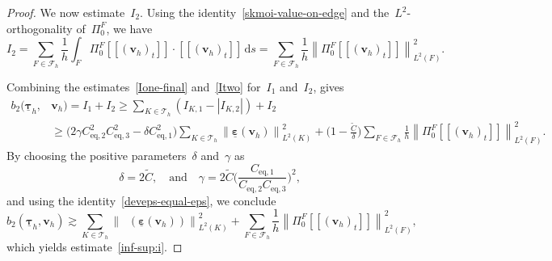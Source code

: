 \documentclass[a4paper,twoside,10pt]{article}
\theoremstyle{plain}
\theoremstyle{remark}
\theoremstyle{definition}
\numberwithin{equation}{section}
\numberwithin{figure}{section}
\newcommand{\Norm}[1]{{\left\|{#1} \right\|}}
\newcommand{\jump}[1]{\left[\!\left[#1\right]\!\right]}
\newcommand{\Tauh}{\mathcal{T}_h}
\newcommand{\K}{K}
\newcommand{\F}{F}
\newcommand{\taubfh}{\underline{\boldsymbol{\tau}}_h}
\newcommand{\vbfh}{\mathbf{v}_h}
\DeclareMathOperator{\dev}{\underline{\mathbf{dev}}}
\newcommand{\tangscalar}{t}
\newcommand{\Ltwo}{L^2}
\newcommand{\Fcalh}{\mathcal{F}_h}
\newcommand{\ds}{\, \mathrm{d}s}
\newcommand{\btwo}{b_2}
\newcommand{\epsbfun}{\underline{\boldsymbol{\varepsilon}}}
\newcommand{\PizF}{\Pi_0^{\F}}
\newcommand{\Ione}{I_1}
\newcommand{\Itwo}{I_2}
\newcommand{\Ctilde}{\widetilde{C}}
\newcommand{\Ceqone}{C_{\text{eq},1}}
\newcommand{\Ceqtwo}{C_{\text{eq},2}}
\newcommand{\Ceqthree}{C_{\text{eq},3}}
\newcommand{\IKone}{I_{\K,1}}
\newcommand{\IKtwo}{I_{\K,2}}
\begin{document}
\begin{proof}
We now estimate~$\Itwo$.
Using the identity~\eqref{skmoi-value-on-edge}
and the~$\Ltwo$-orthogonality of~$\PizF$,
we have
\begin{equation} \label{Itwo}
\Itwo 
= \sum_{\F \in \Fcalh} \frac{1}{h}\int_\F \PizF\jump{(\vbfh)_{\tangscalar}} 
  \cdot \jump{(\vbfh)_{\tangscalar}} \ds
= \sum_{\F \in \Fcalh} \frac{1}{h}
  \Norm{\PizF\jump{(\vbfh)_{\tangscalar}}}_{\Ltwo(\F)}^2.
\end{equation}

Combining the estimates~\eqref{Ione-final} and~\eqref{Itwo}
for~$\Ione$ and~$\Itwo$,
gives
\begin{equation*}
\begin{split}
\btwo(\taubfh,&\vbfh)
= \Ione + \Itwo \geq \sum_{\K\in\Tauh}(\IKone - |\IKtwo|) + \Itwo \\
&\geq \Big(2\gamma\Ceqtwo^2\Ceqthree^2-\delta\Ceqone^2\Big)\sum_{\K \in \Tauh}\Norm{\epsbfun(\vbfh)}_{\Ltwo(\K)}^2
  + \Big(1 - \frac{\Ctilde}{\delta}\Big)
  \sum_{\F \in \Fcalh}
  \frac{1}{h}\Norm{\PizF\jump{(\vbfh)_{\tangscalar}}}_{\Ltwo(\F)}^2.
\end{split}
\end{equation*}
By choosing the positive parameters~$\delta$ and~$\gamma$ as
\begin{equation} \label{delta-gamma}
\delta = 2\Ctilde,
\quad \text{and}\quad
\gamma = 2\Ctilde\Big(\frac{\Ceqone}{\Ceqtwo\Ceqthree}\Big)^2,
\end{equation}
and using the identity~\eqref{deveps-equal-eps},
we conclude
\begin{equation*}
\btwo(\taubfh,\vbfh)
\gtrsim  \sum_{\K \in \Tauh} \Norm{\dev(\epsbfun(\vbfh))}_{\Ltwo(\K)}^2
  + \sum_{\F \in \Fcalh}
  \frac{1}{h}\Norm{\PizF\jump{(\vbfh)_{\tangscalar}}}_{\Ltwo(\F)}^2,
\end{equation*}
which yields estimate~\eqref{inf-sup:i}.


\end{proof}
\end{document}
